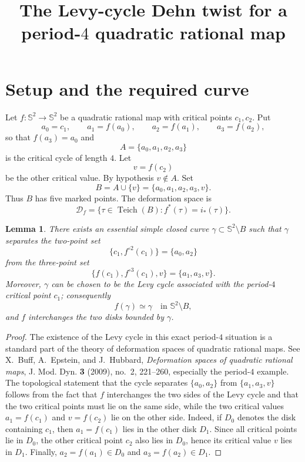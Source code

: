 \documentclass[11pt]{amsart}
\newtheorem{lemma}[theorem]{Lemma}
\theoremstyle{definition}
\theoremstyle{remark}
\begin{document}
\title{The Levy-cycle Dehn twist for a period-\(4\) quadratic rational map}
\author{}
\date{}
\maketitle

\section{Setup and the required curve}

Let \(f:\mathbb S^2\to\mathbb S^2\) be a quadratic rational map with critical points
\(c_1,c_2\).  Put
\[
a_0=c_1,\qquad a_1=f(a_0),\qquad a_2=f(a_1),\qquad a_3=f(a_2),
\]
so that \(f(a_3)=a_0\) and
\[
A=\{a_0,a_1,a_2,a_3\}
\]
is the critical cycle of length \(4\).  Let
\[
v=f(c_2)
\]
be the other critical value.  By hypothesis \(v\notin A\).  Set
\[
B=A\cup\{v\}=\{a_0,a_1,a_2,a_3,v\}.
\]
Thus \(B\) has five marked points.  The deformation space is
\[
\mathcal D_f=\{\tau\in \operatorname{Teich}(B): f^*(\tau)=i_*(\tau)\}.
\]

\begin{lemma}
There exists an essential simple closed curve
\(\gamma\subset \mathbb S^2\setminus B\) such that
\(\gamma\) separates the two-point set
\[
\{c_1,f^{\circ 2}(c_1)\}=\{a_0,a_2\}
\]
from the three-point set
\[
\{f(c_1),f^{\circ 3}(c_1),v\}=\{a_1,a_3,v\}.
\]
Moreover, \(\gamma\) can be chosen to be the Levy cycle associated with the
period-\(4\) critical point \(c_1\); consequently
\[
f(\gamma)\simeq \gamma\quad\text{in }\mathbb S^2\setminus B,
\]
and \(f\) interchanges the two disks bounded by \(\gamma\).
\end{lemma}

\begin{proof}
The existence of the Levy cycle in this exact period-\(4\) situation is a
standard part of the theory of deformation spaces of quadratic rational maps.
See X.~Buff, A.~Epstein, and J.~Hubbard,
\emph{Deformation spaces of quadratic rational maps},
J. Mod. Dyn. \textbf{3} (2009), no.~2, 221--260,
especially the period-\(4\) example.  The topological statement that the
cycle separates \(\{a_0,a_2\}\) from \(\{a_1,a_3,v\}\) follows from the fact
that \(f\) interchanges the two sides of the Levy cycle and that the two
critical points must lie on the same side, while the two critical values
\(a_1=f(c_1)\) and \(v=f(c_2)\) lie on the other side.  Indeed, if
\(D_0\) denotes the disk containing \(c_1\), then
\(a_1=f(c_1)\) lies in the other disk \(D_1\).  Since all critical points
lie in \(D_0\), the other critical point \(c_2\) also lies in \(D_0\), hence
its critical value \(v\) lies in \(D_1\).  Finally,
\(a_2=f(a_1)\in D_0\) and \(a_3=f(a_2)\in D_1\).
\end{proof}
\end{document}
